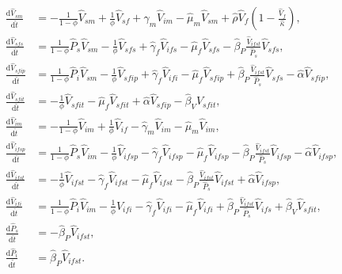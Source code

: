 \documentclass{article}
\newcommand{\md}{\mathrm{d}}
\begin{document}
\begin{equation}
  \begin{split}
    \frac{\md \hat{V}_{sm}}{\md \hat{t}}
    &=
    - \frac{1}{1 - \phi} \hat{V}_{sm}
    + \frac{1}{\phi} \hat{V}_{sf}
    + \hat{\gamma}_m \hat{V}_{im}
    - \hat{\mu}_m \hat{V}_{sm}
    + \hat{\rho} \hat{V}_f \left(1 - \frac{\hat{V}_f}{\hat{\kappa}}\right),
    \\
    \frac{\md \hat{V}_{sfs}}{\md \hat{t}}
    &=
    \frac{1}{1 - \phi} \hat{P}_s \hat{V}_{sm}
    - \frac{1}{\phi} \hat{V}_{sfs}
    + \hat{\gamma}_f \hat{V}_{ifs}
    - \hat{\mu}_f \hat{V}_{sfs}
    - \hat{\beta}_P \frac{\hat{V}_{ifst}}{\hat{P}_s} \hat{V}_{sfs},
    \\
    \frac{\md \hat{V}_{sfip}}{\md \hat{t}}
    &=
    \frac{1}{1 - \phi} \hat{P}_i \hat{V}_{sm}
    - \frac{1}{\phi} \hat{V}_{sfip}
    + \hat{\gamma}_f \hat{V}_{ifi}
    - \hat{\mu}_f \hat{V}_{sfip}
    + \hat{\beta}_P \frac{\hat{V}_{ifst}}{\hat{P}_s} \hat{V}_{sfs}
    - \hat{\alpha} \hat{V}_{sfip},
    \\
    \frac{\md \hat{V}_{sfit}}{\md \hat{t}}
    &=
    - \frac{1}{\phi} \hat{V}_{sfit}
    - \hat{\mu}_f \hat{V}_{sfit}
    + \hat{\alpha} \hat{V}_{sfip}
    - \hat{\beta}_V \hat{V}_{sfit},
    \\
    \frac{\md \hat{V}_{im}}{\md \hat{t}}
    &=
    - \frac{1}{1 - \phi} \hat{V}_{im}
    + \frac{1}{\phi} \hat{V}_{if}
    - \hat{\gamma}_m \hat{V}_{im}
    - \hat{\mu}_m \hat{V}_{im},
    \\
    \frac{\md \hat{V}_{ifsp}}{\md \hat{t}}
    &=
    \frac{1}{1 - \phi} \hat{P}_s \hat{V}_{im}
    - \frac{1}{\phi} \hat{V}_{ifsp}
    - \hat{\gamma}_f \hat{V}_{ifsp}
    - \hat{\mu}_f \hat{V}_{ifsp}
    - \hat{\beta}_P \frac{\hat{V}_{ifst}}{\hat{P}_s} \hat{V}_{ifsp}
    - \hat{\alpha} \hat{V}_{ifsp},
    \\
    \frac{\md \hat{V}_{ifst}}{\md \hat{t}}
    &=
    - \frac{1}{\phi} \hat{V}_{ifst}
    - \hat{\gamma}_f \hat{V}_{ifst}
    - \hat{\mu}_f \hat{V}_{ifst}
    - \hat{\beta}_P \frac{\hat{V}_{ifst}}{\hat{P}_s} \hat{V}_{ifst}
    + \hat{\alpha} \hat{V}_{ifsp},
    \\
    \frac{\md \hat{V}_{ifi}}{\md \hat{t}}
    &=
    \frac{1}{1 - \phi} \hat{P}_i \hat{V}_{im}
    - \frac{1}{\phi} \hat{V}_{ifi}
    - \hat{\gamma}_f \hat{V}_{ifi}
    - \hat{\mu}_f \hat{V}_{ifi}
    + \hat{\beta}_P \frac{\hat{V}_{ifst}}{\hat{P}_s} \hat{V}_{ifs}
    + \hat{\beta}_V \hat{V}_{sfit},
    \\
    \frac{\md \hat{P}_s}{\md \hat{t}}
    &=
    - \hat{\beta}_P \hat{V}_{ifst},
    \\
    \frac{\md \hat{P}_i}{\md \hat{t}}
    &=
    \hat{\beta}_P \hat{V}_{ifst}.
  \end{split}
\end{equation}
\end{document}
